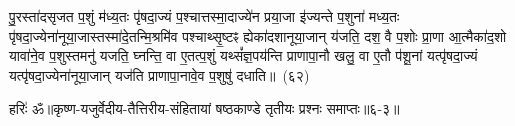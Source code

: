 पु॒रस्ता॑दसृजत प॒शुं म॑ध्य॒तः पृ॑षदा॒ज्यं प॒श्चात्तस्मा॒दाज्ये॑न प्रया॒जा इ॑ज्यन्ते प॒शुना॑ मध्य॒तः पृ॑षदा॒ज्येना॑नूया॒जास्तस्मा॑दे॒तन्मि॒श्रमि॑व पश्चाथ्सृ॒ष्टꣴ ह्येका॑\-दशानूया॒जान् य॑जति॒ दश॒ वै प॒शोः प्रा॒णा आ॒त्मैका॑द॒शो यावा॑ने॒व प॒शुस्तमनु॑ यजति॒ घ्नन्ति॒ वा ए॒तत्प॒शुं यथ्सं᳚ज्ञ॒पय॑न्ति प्राणापा॒नौ खलु॒ वा ए॒तौ प॑शू॒नां यत्पृ॑षदा॒ज्यं यत्पृ॑षदा॒ज्येना॑नूया॒जान् यज॑ति प्राणापा॒नावे॒व प॒शुषु॑ दधाति॥~(६२)\ip

{\anuvakamend[{घ्नन्ति॒ यन्तं॒ खलु॑ च॒तुरुप॑ ह्वयत॒ आज्यं॒ यत्पृ॑षदा॒ज्येन॒ षट्च॑}]}%

{हरिः॑ ॐ}{॥कृष्ण-यजुर्वेदीय-तैत्तिरीय-संहितायां षष्ठकाण्डे तृतीयः प्रश्नः समाप्तः॥६-३॥}


